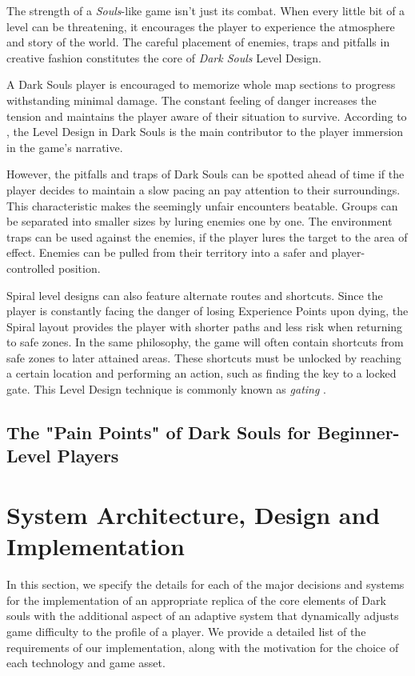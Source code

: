 The strength of a \emph{Souls}-like game isn't just its combat. When every little bit of a level can be threatening, it encourages the player to experience the atmosphere and story of the world. The careful placement of enemies, traps and pitfalls in creative fashion constitutes the core of \emph{Dark Souls} Level Design.

A Dark Souls player is encouraged to memorize whole map sections to progress withstanding minimal damage. The constant feeling of danger increases the tension and maintains the player aware of their situation to survive. According to , the Level Design in  Dark Souls is the main contributor to the player immersion in the game's narrative.

However, the pitfalls and traps of Dark Souls can be spotted ahead of time if the player decides to maintain a slow pacing an pay attention to their surroundings. This characteristic makes the seemingly unfair encounters beatable. Groups can be separated into smaller sizes by luring enemies one by one. The environment traps can be used against the enemies, if the player lures the target to the area of effect. Enemies can be pulled from their territory into a safer and player-controlled position.

Spiral level designs can also feature alternate routes and shortcuts. Since the player is constantly facing the danger of losing Experience Points upon dying, the Spiral layout provides the player with shorter paths and less risk when returning to safe zones. In the same philosophy, the game will often contain shortcuts from safe zones to later attained areas. These shortcuts must be unlocked by reaching a certain location and performing an action, such as finding the key to a locked gate. This Level Design technique is commonly known as \emph{gating} \cite{BOOK_LevelUpTheGuideToGreat}.

\subsection{The "Pain Points" of Dark Souls for Beginner-Level Players}

\section{System Architecture, Design and Implementation}

In this section, we specify the details for each of the major decisions and systems for the implementation of an appropriate replica of the core elements of Dark souls with the additional aspect of an adaptive system that dynamically adjusts game difficulty to the profile of a player. We provide a detailed list of the requirements of our implementation, along with the motivation for the choice of each technology and game asset.


